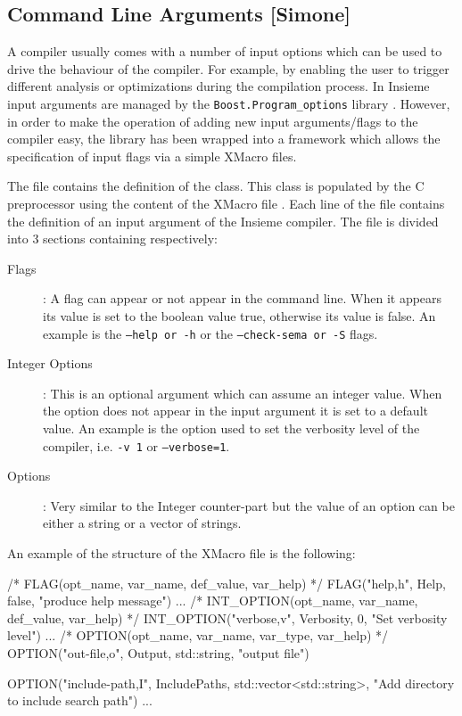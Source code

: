 \subsection{Command Line Arguments [Simone]}

\label{Command.Line.Args}

A compiler usually comes with a number of input options which can be used to
drive the behaviour of the compiler. For example, by enabling the user to
trigger different analysis or optimizations during the compilation process.
In Insieme input arguments are managed by the {\tt Boost.Program\_options}
library \cite{boost_program_options}. However, in order to make the operation of
adding new input arguments/flags to the compiler easy, the library has been
wrapped into a framework which allows the specification of input flags via a
simple XMacro files. 

The file  contains the definition of the
 class. This class is populated by the C preprocessor
using the content of the XMacro file . Each line of the
file contains the definition of an input argument of the Insieme compiler. The
file is divided into 3 sections containing respectively: 

\begin{description}
\item [Flags]: A flag can appear or not appear in the command line. When it
appears its value is set to the boolean value true, otherwise its value is
false. An example is the {\tt --help or -h} or the {\tt --check-sema or -S}
flags. 

\item [Integer Options]: This is an optional argument which can assume an
integer value. When the option does not appear in the input argument it is set
to a default value. An example is the option used to set the verbosity level of
the compiler, i.e. {\tt -v 1} or {\tt --verbose=1}. 

\item [Options]: Very similar to the Integer counter-part but the value of an
option can be either a string or a vector of strings.
\end{description}

An example of the structure of the  XMacro file is the
following:

\begin{insCode} 
/* FLAG(opt_name, var_name, def_value, var_help) */
FLAG("help,h",    Help,     false,     "produce help message")
...
/* INT_OPTION(opt_name, var_name, def_value, var_help) */
INT_OPTION("verbose,v", Verbosity, 0, "Set verbosity level")
...
/* OPTION(opt_name, var_name, var_type, var_help) */ 
OPTION("out-file,o", Output,  std::string, "output file")

OPTION("include-path,I", IncludePaths, std::vector<std::string>, 	
	   "Add directory to include search path")
...
\end{insCode}

